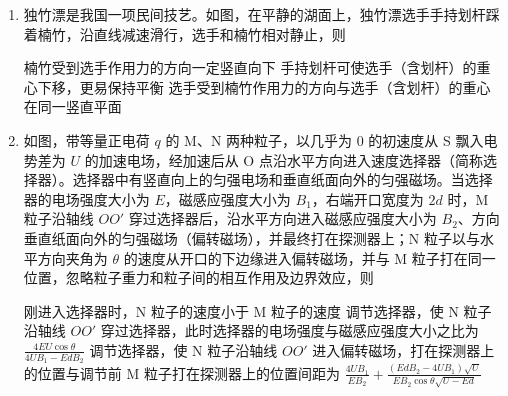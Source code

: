 \documentclass[\gkver]{gaokaozhenti}
\begin{document}
\begin{enumerate}
{D．酒精可以溶解油酸，使油酸更容易在水面上展开形成单分子油膜，所以实验时加酒精比不加酒精更好地展开油膜，故 D 错误。

故选 AB。
}

\item
独竹漂是我国一项民间技艺。如图，在平静的湖面上，独竹漂选手手持划杆踩着楠竹，沿直线减速滑行，选手和楠竹相对静止，则


{楠竹受到选手作用力的方向一定竖直向下}
{手持划杆可使选手（含划杆）的重心下移，更易保持平衡}
{选手受到楠竹作用力的方向与选手（含划杆）的重心在同一竖直平面}


\item
如图，带等量正电荷 $q$ 的 M、N 两种粒子，以几乎为 0 的初速度从 S 飘入电势差为 $U$ 的加速电场，经加速后从 O 点沿水平方向进入速度选择器（简称选择器）。选择器中有竖直向上的匀强电场和垂直纸面向外的匀强磁场。当选择器的电场强度大小为 $E$，磁感应强度大小为 $B_{1}$，右端开口宽度为 $2d$ 时，M 粒子沿轴线 $OO'$ 穿过选择器后，沿水平方向进入磁感应强度大小为 $B_{2}$、方向垂直纸面向外的匀强磁场（偏转磁场），并最终打在探测器上；N 粒子以与水平方向夹角为 $\theta$ 的速度从开口的下边缘进入偏转磁场，并与 M 粒子打在同一位置，忽略粒子重力和粒子间的相互作用及边界效应，则


{刚进入选择器时，N 粒子的速度小于 M 粒子的速度}
{调节选择器，使 N 粒子沿轴线 $OO'$ 穿过选择器，此时选择器的电场强度与磁感应强度大小之比为 $\frac{4EU\cos\theta}{4UB_{1} - EdB_{2}}$}
{调节选择器，使 N 粒子沿轴线 $OO'$ 进入偏转磁场，打在探测器上的位置与调节前 M 粒子打在探测器上的位置间距为 $\frac{4UB_{1}}{EB_{2}} + \frac{(EdB_{2} - 4UB_{1})\sqrt{U}}{EB_{2}\cos\theta\sqrt{U - Ed}}$}


\end{enumerate}
\end{document}

